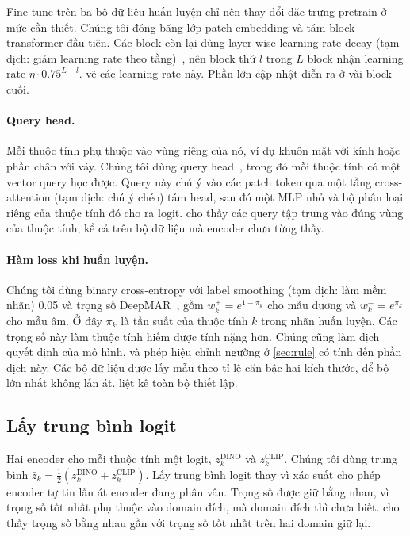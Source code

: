 \documentclass[10pt,twocolumn,letterpaper]{article}
\begin{document}
Fine-tune trên ba bộ dữ liệu huấn luyện chỉ nên thay đổi đặc trưng pretrain ở mức cần thiết. Chúng tôi đóng băng lớp patch embedding và tám block transformer đầu tiên. Các block còn lại dùng layer-wise learning-rate decay (tạm dịch: giảm learning rate theo tầng)~\cite{beit}, nên block thứ $l$ trong $L$ block nhận learning rate $\eta\cdot0.75^{L-l}$.  vẽ các learning rate này. Phần lớn cập nhật diễn ra ở vài block cuối.

\paragraph{Query head.} Mỗi thuộc tính phụ thuộc vào vùng riêng của nó, ví dụ khuôn mặt với kính hoặc phần chân với váy. Chúng tôi dùng query head~\cite{q2l,mldecoder}, trong đó mỗi thuộc tính có một vector query học được. Query này chú ý vào các patch token qua một tầng cross-attention (tạm dịch: chú ý chéo) tám head, sau đó một MLP nhỏ và bộ phân loại riêng của thuộc tính đó cho ra logit.  cho thấy các query tập trung vào đúng vùng của thuộc tính, kể cả trên bộ dữ liệu mà encoder chưa từng thấy.

\paragraph{Hàm loss khi huấn luyện.} Chúng tôi dùng binary cross-entropy với label smoothing (tạm dịch: làm mềm nhãn) 0.05 và trọng số DeepMAR~\cite{deepmar}, gồm $w_k^{+}=e^{1-\pi_k}$ cho mẫu dương và $w_k^{-}=e^{\pi_k}$ cho mẫu âm. Ở đây $\pi_k$ là tần suất của thuộc tính $k$ trong nhãn huấn luyện. Các trọng số này làm thuộc tính hiếm được tính nặng hơn. Chúng cũng làm dịch quyết định của mô hình, và phép hiệu chỉnh ngưỡng ở \cref{sec:rule} có tính đến phần dịch này. Các bộ dữ liệu được lấy mẫu theo tỉ lệ căn bậc hai kích thước, để bộ lớn nhất không lấn át.  liệt kê toàn bộ thiết lập.

\subsection{Lấy trung bình logit}
\label{sec:ensemble}

Hai encoder cho mỗi thuộc tính một logit, $z_k^{\text{DINO}}$ và $z_k^{\text{CLIP}}$. Chúng tôi dùng trung bình $\bar z_k=\frac12(z_k^{\text{DINO}}+z_k^{\text{CLIP}})$. Lấy trung bình logit thay vì xác suất cho phép encoder tự tin lấn át encoder đang phân vân. Trọng số được giữ bằng nhau, vì trọng số tốt nhất phụ thuộc vào domain đích, mà domain đích thì chưa biết.  cho thấy trọng số bằng nhau gần với trọng số tốt nhất trên hai domain giữ lại.
\end{document}
